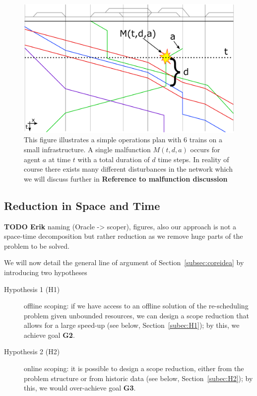 \documentclass{article}
\begin{document}
%
\begin{figure}[hbtp]
	\centering
  \includegraphics[width=\textwidth]{Figures/malfunction_generation.pdf}
	\caption{This figure illustrates a simple operations plan with 6 trains on a small infrastructure. A single malfunction $M(t,d,a)$ occurs for agent $a$ at time $t$ with a total duration of $d$ time steps. In reality of course there exists many different disturbances in the network which we will discuss further in \textbf{Reference to malfunction discussion}}
	\label{fig:introduction_no_loop}
\end{figure}

\subsection{Reduction in Space and Time}\label{subec:slicing}

\begin{mdframed}
{\bf TODO Erik} naming (Oracle -> scoper), figures, also our approach is not a space-time decomposition but rather reduction as we remove huge parts of the problem to be solved.
\end{mdframed}

We will now detail the general line of argument of Section~\ref{subsec:coreidea} by introducing two hypotheses
\begin{description}
\item [Hypothesis 1 (H1)] offline scoping: if we have access to an offline solution of the re-scheduling problem given unbounded resources, we can design a scope reduction that allows for a large speed-up (see below, Section~\ref{subec:H1}); by this, we achieve goal \textbf{G2}.
\item [Hypothesis 2 (H2)] online scoping: it is possible to design a scope reduction, either from the problem structure or from historic data (see below, Section~\ref{subec:H2}); by this, we would over-achieve goal \textbf{G3}.
\end{description}
\end{document}
